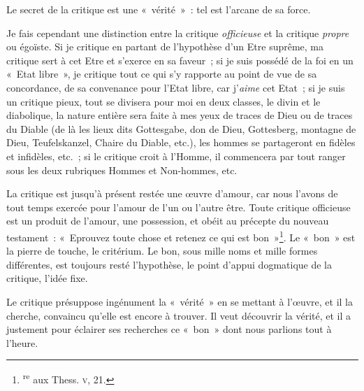 \documentclass[french,twoside]{book} %
\begin{document}
Le secret de la critique est une « vérité » : tel est l’arcane de sa force.\par
Je fais cependant une distinction entre la critique \emph{officieuse} et la critique \emph{propre} ou égoïste. Si je critique en partant de l’hypothèse d’un Etre suprême, ma critique sert à cet Etre et s’exerce en sa faveur ; si je suis possédé de la foi en un « Etat libre », je critique tout ce qui s’y rapporte au point de vue de sa concordance, de sa convenance pour l’Etat libre, car j’\emph{aime} cet Etat ; si je suis un critique pieux,  tout se divisera pour moi en deux classes, le divin et le diabolique, la nature entière sera faite à mes yeux de traces de Dieu ou de traces du Diable (de là les lieux dits Gottesgabe, don de Dieu, Gottesberg, montagne de Dieu, Teufelskanzel, Chaire du Diable, etc.), les hommes se partageront en fidèles et infidèles, etc. ; si le critique croit à l’Homme, il commencera par tout ranger sous les deux rubriques Hommes et Non-hommes, etc.\par
La critique est jusqu’à présent restée une œuvre d’amour, car nous l’avons de tout temps exercée pour l’amour de l’un ou l’autre être. Toute critique officieuse est un produit de l’amour, une possession, et obéit au précepte du nouveau testament : « Eprouvez toute chose et retenez ce qui est bon »\footnote{ \textsuperscript{re} aux Thess. {\scshape v}, 21.
 }. Le « bon » est la pierre de touche, le critérium. Le bon, sous mille noms et mille formes différentes, est toujours resté l’hypothèse, le point d’appui dogmatique de la critique, l’idée fixe.\par
Le critique présuppose ingénument la « vérité » en se mettant à l’œuvre, et il la cherche, convaincu qu’elle est encore à trouver. Il veut découvrir la vérité, et il a justement pour éclairer ses recherches ce « bon » dont nous parlions tout à l’heure.\par
\end{document}
